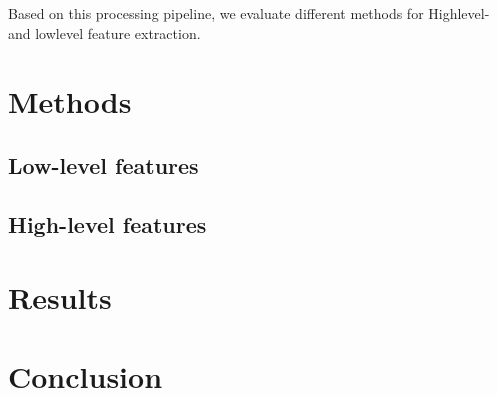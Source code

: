 \documentclass[10pt,twocolumn,letterpaper]{article}
\begin{document}
Based on this processing pipeline, we evaluate different methods for Highlevel- and lowlevel feature extraction.

\section{Methods}

\subsection{Low-level features}

\subsection{High-level features}

\section{Results}

\section{Conclusion}


{\small


}
\end{document}
